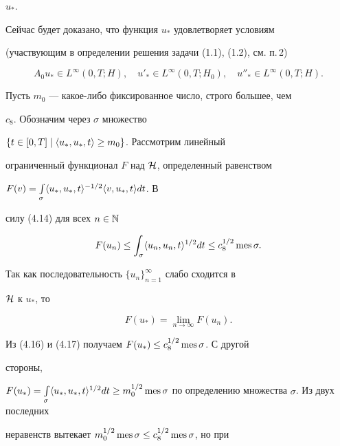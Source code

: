 \begin{pf}
$u_*$. 


 


Сейчас будет доказано, что функция $u_*$ удовлетворяет условиям 


(участвующим в определении решения задачи (1.1), (1.2), см.{} п.\,2) 


\begin{equation} 


A_0u_*\in L^\infty(0,T;H),\quad 


u'_*\in L^\infty(0,T;H_0),\quad 


u''_*\in L^\infty(0,T;H). 


\end{equation} 


Пусть $m_0$ --- какое-либо фиксированное число, строго большее, чем 


$c_8$. Обозначим через $\sigma$ множество 


$\{t\in[0,T]\mid\langle u_*,u_*,t\rangle\ge m_0\}$. Рассмотрим линейный 


ограниченный функционал $F$ над $\cal H$, определенный равенством 


$F(v)=\int\limits_\sigma\langle u_*,u_*,t\rangle^{-1/2}\langle v,u_*,t\rangle dt$. В 


силу (4.14) для всех $n\in\Bbb N$ 


\begin{equation} 


F(u_n)\le\int_\sigma\la u_n,u_n,t\ra^{1/2}dt\le 


c^{1/2}_8\mes\sigma. 


\end{equation} 


Так как последовательность $\{u_n\}^\infty_{n=1}$ слабо сходится в 


$\cal H$ к $u_*$, то 


\begin{equation} 


F(u_*)=\lim_{n\to\infty}F(u_n). 


\end{equation} 


Из (4.16) и (4.17) получаем $F(u_*)\le c^{1/2}_8\operatorname{mes}\sigma$. С другой 


стороны,


$F(u_*)=\int\limits_\sigma\la u_*,u_*,t\ra^{1/2}dt\ge m^{1/2}_0 


\mes\sigma$ по определению множества $\sigma$. Из двух последних 


неравенств вытекает $m^{1/2}_0\operatorname{mes}\sigma\le c^{1/2}_8\operatorname{mes}\sigma$, но при 



\end{pf}
